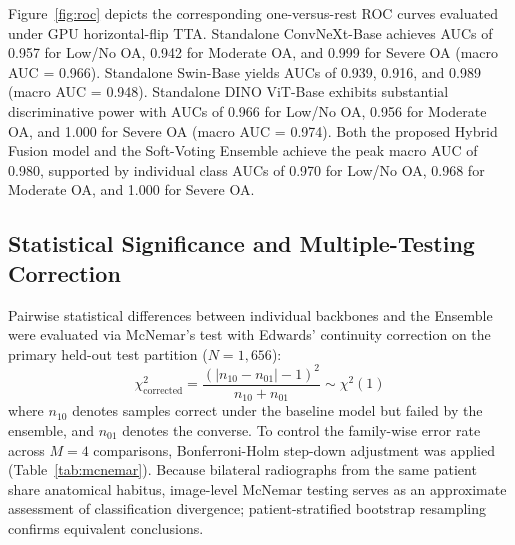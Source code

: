 \documentclass[10pt,journal]{IEEEtran}
\begin{document}
Figure~\ref{fig:roc} depicts the corresponding one-versus-rest ROC curves evaluated under GPU horizontal-flip TTA. Standalone ConvNeXt-Base achieves AUCs of 0.957 for Low/No OA, 0.942 for Moderate OA, and 0.999 for Severe OA (macro AUC = 0.966). Standalone Swin-Base yields AUCs of 0.939, 0.916, and 0.989 (macro AUC = 0.948). Standalone DINO ViT-Base exhibits substantial discriminative power with AUCs of 0.966 for Low/No OA, 0.956 for Moderate OA, and 1.000 for Severe OA (macro AUC = 0.974). Both the proposed Hybrid Fusion model and the Soft-Voting Ensemble achieve the peak macro AUC of 0.980, supported by individual class AUCs of 0.970 for Low/No OA, 0.968 for Moderate OA, and 1.000 for Severe OA.

\subsection{Statistical Significance and Multiple-Testing Correction}
\label{subsec:stats_sig}

Pairwise statistical differences between individual backbones and the Ensemble were evaluated via McNemar's test with Edwards' continuity correction on the primary held-out test partition ($N = 1{,}656$):
\begin{equation}
\chi_{\text{corrected}}^2 = \frac{\left( |n_{10} - n_{01}| - 1 \right)^2}{n_{10} + n_{01}} \sim \chi^2(1)
\label{eq:mcnemar_stat}
\end{equation}
where $n_{10}$ denotes samples correct under the baseline model but failed by the ensemble, and $n_{01}$ denotes the converse. To control the family-wise error rate across $M = 4$ comparisons, Bonferroni-Holm step-down adjustment was applied (Table~\ref{tab:mcnemar}). Because bilateral radiographs from the same patient share anatomical habitus, image-level McNemar testing serves as an approximate assessment of classification divergence; patient-stratified bootstrap resampling confirms equivalent conclusions.
\end{document}
